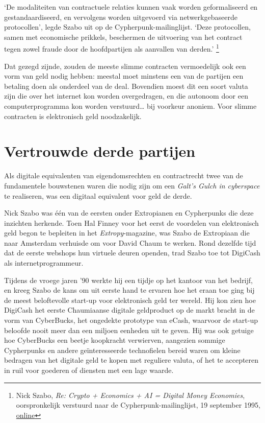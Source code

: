 \documentclass[
  a5paper,
  smalldemyvopaper,11pt,twoside,onecolumn,openright,extrafontsizes,
hidelinks]{memoir}
\begin{document}
`De modaliteiten van contractuele relaties kunnen vaak worden
geformaliseerd en gestandaardiseerd, en vervolgens worden uitgevoerd via
netwerkgebaseerde protocollen', legde Szabo uit op de
Cypherpunk-mailinglijst. `Deze protocollen, samen met economische
prikkels, beschermen de uitvoering van het contract tegen zowel fraude
door de hoofdpartijen als aanvallen van derden.' \footnote{Nick Szabo,
  \emph{Re: Crypto + Economics + AI = Digital Money Economies},
  oorspronkelijk verstuurd naar de Cypherpunk-mailinglijst, 19 september
  1995,
  \href{https://cypherpunks.venona.com/date/1995/09/msg01303.html}{online}}

Dat gezegd zijnde, zouden de meeste slimme contracten vermoedelijk ook
een vorm van geld nodig hebben: meestal moet minstens een van de
partijen een betaling doen als onderdeel van de deal. Bovendien moest
dit een soort valuta zijn die over het internet kon worden overgedragen,
en die autonoom door een computerprogramma kon worden verstuurd\ldots{}
bij voorkeur anoniem. Voor slimme contracten is elektronisch geld
noodzakelijk.

\section{Vertrouwde derde partijen}\label{vertrouwde-derde-partijen}

Als digitale equivalenten van eigendomsrechten en contractrecht twee van
de fundamentele bouwstenen waren die nodig zijn om een \emph{Galt's
Gulch in cyberspace} te realiseren, was een digitaal equivalent voor
geld de derde.

Nick Szabo was één van de eersten onder Extropianen en Cypherpunks die
deze inzichten herkende. Toen Hal Finney voor het eerst de voordelen van
elektronisch geld begon te bepleiten in het \emph{Extropy}-magazine, was
Szabo de Extropiaan die naar Amsterdam verhuisde om voor David Chaum te
werken. Rond dezelfde tijd dat de eerste webshops hun virtuele deuren
openden, trad Szabo toe tot DigiCash als internetprogrammeur.

Tijdens de vroege jaren '90 werkte hij een tijdje op het kantoor van het
bedrijf, en kreeg Szabo de kans om uit eerste hand te ervaren hoe het
eraan toe ging bij de meest beloftevolle start-up voor elektronisch geld
ter wereld. Hij kon zien hoe DigiCash het eerste Chaumiaanse digitale
geldproduct op de markt bracht in de vorm van CyberBucks, het ongedekte
prototype van eCash, waarvoor de start-up beloofde nooit meer dan een
miljoen eenheden uit te geven. Hij was ook getuige hoe CyberBucks een
beetje koopkracht verwierven, aangezien sommige Cypherpunks en andere
geïnteresseerde technofielen bereid waren om kleine bedragen van het
digitale geld te kopen met reguliere valuta, of het te accepteren in
ruil voor goederen of diensten met een lage waarde.
\end{document}
